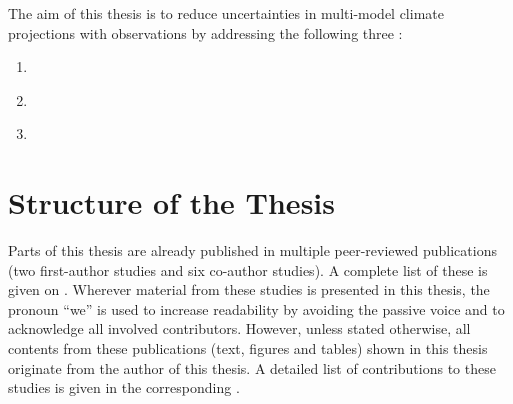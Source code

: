 The aim of this thesis is to reduce uncertainties in multi-model climate
projections with observations by addressing the following three
:

\begingroup
{}
\begin{enumerate}
  \item \label{enum:01:question_1} \KeyScienceQuestionOne{}
  \item \label{enum:01:question_2} \KeyScienceQuestionTwo{}
  \item \label{enum:01:question_3} \KeyScienceQuestionThree{}
\end{enumerate}
\endgroup


\section{Structure of the Thesis}
\label{sec:01:structure}

Parts of this thesis are already published in multiple peer-reviewed
publications (two first-author studies and six co-author studies). A complete
list of these is given on . Wherever material from these
studies is presented in this thesis, the pronoun \enquote{we} is used to
increase readability by avoiding the passive voice and to acknowledge all
involved contributors. However, unless stated otherwise, all contents from
these publications (text, figures and tables) shown in this thesis originate
from the author of this thesis. A detailed list of contributions to these
studies is given in the corresponding .

